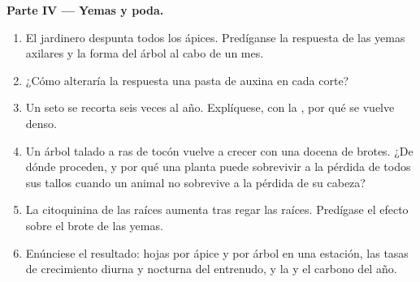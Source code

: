 \begin{problem}
\medskip
\noindent\textbf{Parte IV --- Yemas y poda.}
\begin{enumerate}[resume]
  \item El jardinero despunta todos los ápices. Predíganse la respuesta de
        las yemas axilares y la forma del árbol al cabo de un mes.
  \item ¿Cómo alteraría la respuesta una pasta de auxina en cada corte?
  \item Un seto se recorta seis veces al año. Explíquese, con la , por qué se vuelve denso.
  \item Un árbol talado a ras de tocón vuelve a crecer con una docena de
        brotes. ¿De dónde proceden, y por qué una planta puede sobrevivir a
        la pérdida de todos sus tallos cuando un animal no sobrevive a la
        pérdida de su cabeza?
  \item La citoquinina de las raíces aumenta tras regar las raíces.
        Predígase el efecto sobre el brote de las yemas.
  \item Enúnciese el resultado: hojas por ápice y por árbol en una
        estación, las tasas de crecimiento diurna y nocturna del entrenudo,
        y la  y el carbono del año.
\end{enumerate}
\end{problem}
